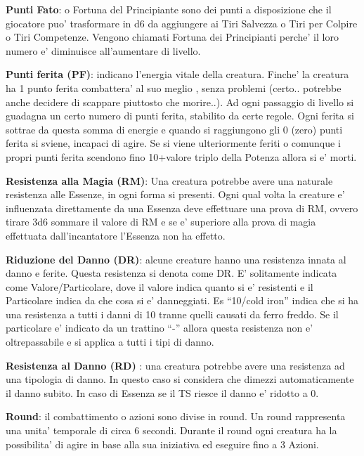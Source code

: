 \documentclass[a4paper,11pt,twoside,openany]{dndbook}
\begin{document}
\textbf{Punti Fato}: o Fortuna del Principiante sono dei punti a disposizione che il giocatore puo’ trasformare in d6 da aggiungere ai Tiri Salvezza o Tiri per Colpire o Tiri Competenze. Vengono chiamati Fortuna dei Principianti perche’ il loro numero e’ diminuisce all’aumentare di livello.

\textbf{Punti ferita (PF)}: indicano l’energia vitale della creatura. Finche’ la creatura ha 1 punto ferita combattera’ al suo meglio , senza problemi (certo.. potrebbe anche decidere di scappare piuttosto che morire..).
Ad ogni passaggio di livello si guadagna un certo numero di punti ferita, stabilito da certe regole. Ogni ferita si sottrae da questa somma di energie e quando si raggiungono gli 0 (zero) punti ferita si sviene, incapaci di agire. Se si viene ulteriormente feriti o comunque i propri punti ferita scendono fino 10+valore triplo della Potenza allora si e’ morti.

\textbf{Resistenza alla Magia (RM)}: Una creatura potrebbe avere una naturale resistenza alle Essenze, in ogni forma si presenti. Ogni qual volta la creature e' influenzata direttamente da una Essenza deve effettuare una prova di RM, ovvero tirare 3d6 sommare il valore di RM e se e' superiore alla prova di magia effettuata dall'incantatore l'Essenza non ha effetto.

\textbf{Riduzione del Danno (DR)}:   alcune creature hanno una resistenza innata al danno e ferite. Questa resistenza si denota come DR.
E’ solitamente indicata come Valore/Particolare, dove il valore indica quanto si e’ resistenti e il Particolare indica da che cosa si e’ danneggiati. Es “10/cold iron” indica che si ha una resistenza a tutti i danni di 10 tranne quelli causati da ferro freddo.
Se il particolare e’ indicato da un trattino “-” allora questa resistenza non e’ oltrepassabile e si applica a tutti i tipi di danno.

\textbf{Resistenza al Danno (RD)}  : una creatura potrebbe avere una resistenza ad una tipologia di danno. In questo caso si considera che dimezzi automaticamente il danno subito.
In caso di Essenza se il TS riesce il danno e' ridotto a 0.

\textbf{Round}: il combattimento o azioni sono divise in round. Un round rappresenta una unita' temporale di circa 6 secondi. Durante il round ogni creatura ha la possibilita' di agire in base alla sua iniziativa ed eseguire fino a 3 Azioni.
\end{document}
